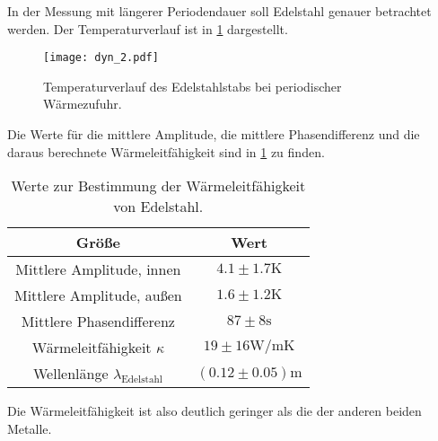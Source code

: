  In der Messung mit längerer Periodendauer soll Edelstahl genauer betrachtet werden. Der Temperaturverlauf ist in \ref{fig:dynedel} dargestellt.

  \begin{figure}
    \centering
    \texttt{[image: dyn\_2.pdf]}
    \caption{Temperaturverlauf des Edelstahlstabs bei periodischer Wärmezufuhr.}
    \label{fig:dynedel}
  \end{figure}

  \FloatBarrier

  \noindent Die Werte für die mittlere Amplitude, die mittlere Phasendifferenz und die daraus berechnete Wärmeleitfähigkeit sind in \ref{tab:gehsterben} zu finden.

  \begin{table}
    \centering
    \caption{Werte zur Bestimmung der Wärmeleitfähigkeit von Edelstahl.}
    \label{tab:gehsterben}
    \begin{tabular}{c c }
      \toprule
      Größe & Wert \\
      \midrule %
      Mittlere Amplitude, innen & $4.1 \pm 1.7 \si{\kelvin}$\\
      Mittlere Amplitude, außen & $1.6 \pm 1.2 \si{\kelvin}$\\
      Mittlere Phasendifferenz & $ 87 \pm 8\si{\s}$ \\%
      Wärmeleitfähigkeit $\kappa$ & $19 \pm 16 \si{\watt\per\m\kelvin}$ \\ %
      Wellenlänge $\lambda_{\text{Edelstahl}}$ & $(0.12 \pm 0.05) \si{\m}$\\
      \bottomrule
    \end{tabular}
  \end{table}

  \FloatBarrier
  \noindent Die Wärmeleitfähigkeit ist also deutlich geringer als die der anderen beiden Metalle.